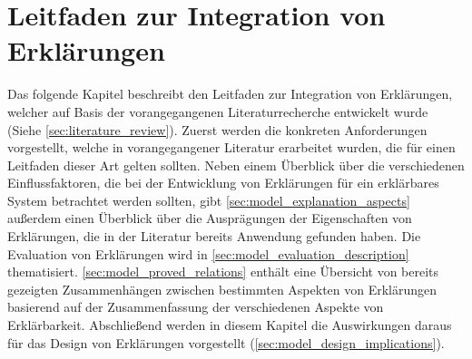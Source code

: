 \chapter{Leitfaden zur Integration von Erklärungen}

Das folgende Kapitel beschreibt den Leitfaden zur Integration von Erklärungen, welcher auf Basis der vorangegangenen Literaturrecherche entwickelt wurde (Siehe \autoref{sec:literature_review}). Zuerst werden die konkreten Anforderungen vorgestellt, welche in vorangegangener Literatur erarbeitet wurden, die für einen Leitfaden dieser Art gelten sollten. Neben einem Überblick über die verschiedenen Einflussfaktoren, die bei der Entwicklung von Erklärungen für ein erklärbares System betrachtet werden sollten, gibt \autoref{sec:model_explanation_aspects} außerdem einen Überblick über die Ausprägungen der Eigenschaften von Erklärungen, die in der Literatur bereits Anwendung gefunden haben. Die Evaluation von Erklärungen wird in \autoref{sec:model_evaluation_description} thematisiert. \autoref{sec:model_proved_relations} enthält eine Übersicht von bereits gezeigten Zusammenhängen zwischen bestimmten Aspekten von Erklärungen basierend auf der Zusammenfassung der verschiedenen Aspekte von Erklärbarkeit. Abschließend werden in diesem Kapitel die Auswirkungen daraus für das Design von Erklärungen vorgestellt (\autoref{sec:model_design_implications}).

% 





